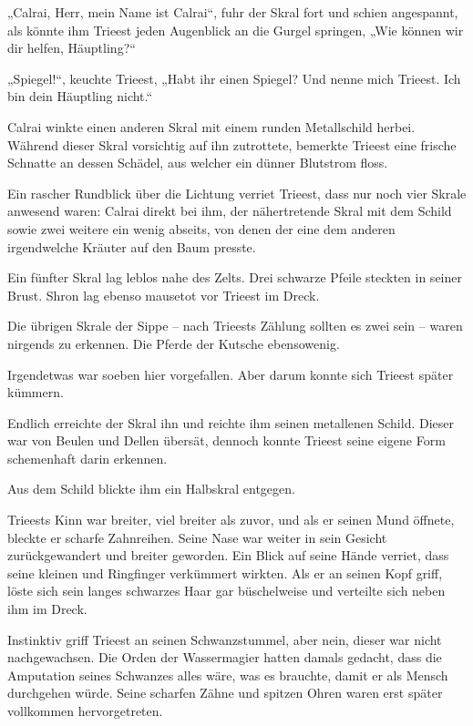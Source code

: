 „Calrai, Herr, mein Name ist Calrai“, fuhr der Skral fort und schien angespannt, als könnte ihm Trieest jeden Augenblick an die Gurgel springen, „Wie können wir dir helfen, Häuptling?“

„Spiegel!“, keuchte Trieest, „Habt ihr einen Spiegel? Und nenne mich Trieest. Ich bin dein Häuptling nicht.“

Calrai winkte einen anderen Skral mit einem runden Metallschild herbei. Während dieser Skral vorsichtig auf ihn zutrottete, bemerkte Trieest eine frische Schnatte an dessen Schädel, aus welcher ein dünner Blutstrom floss.

Ein rascher Rundblick über die Lichtung verriet Trieest, dass nur noch vier Skrale anwesend waren: Calrai direkt bei ihm, der nähertretende Skral mit dem Schild sowie zwei weitere ein wenig abseits, von denen der eine dem anderen irgendwelche Kräuter auf den Baum presste.

Ein fünfter Skral lag leblos nahe des Zelts. Drei schwarze Pfeile steckten in seiner Brust. Shron lag ebenso mausetot vor Trieest im Dreck.

Die übrigen Skrale der Sippe – nach Trieests Zählung sollten es zwei sein – waren nirgends zu erkennen. Die Pferde der Kutsche ebensowenig.

Irgendetwas war soeben hier vorgefallen. Aber darum konnte sich Trieest später kümmern.

Endlich erreichte der Skral ihn und reichte ihm seinen metallenen Schild. Dieser war von Beulen und Dellen übersät, dennoch konnte Trieest seine eigene Form schemenhaft darin erkennen.

Aus dem Schild blickte ihm ein Halbskral entgegen.

Trieests Kinn war breiter, viel breiter als zuvor, und als er seinen Mund öffnete, bleckte er scharfe Zahnreihen. Seine Nase war weiter in sein Gesicht zurückgewandert und breiter geworden. Ein Blick auf seine Hände verriet, dass seine kleinen und Ringfinger verkümmert wirkten. Als er an seinen Kopf griff, löste sich sein langes schwarzes Haar gar büschelweise und verteilte sich neben ihm im Dreck.

Instinktiv griff Trieest an seinen Schwanzstummel, aber nein, dieser war nicht nachgewachsen. Die Orden der Wassermagier hatten damals gedacht, dass die Amputation seines Schwanzes alles wäre, was es brauchte, damit er als Mensch durchgehen würde. Seine scharfen Zähne und spitzen Ohren waren erst später vollkommen hervorgetreten.

